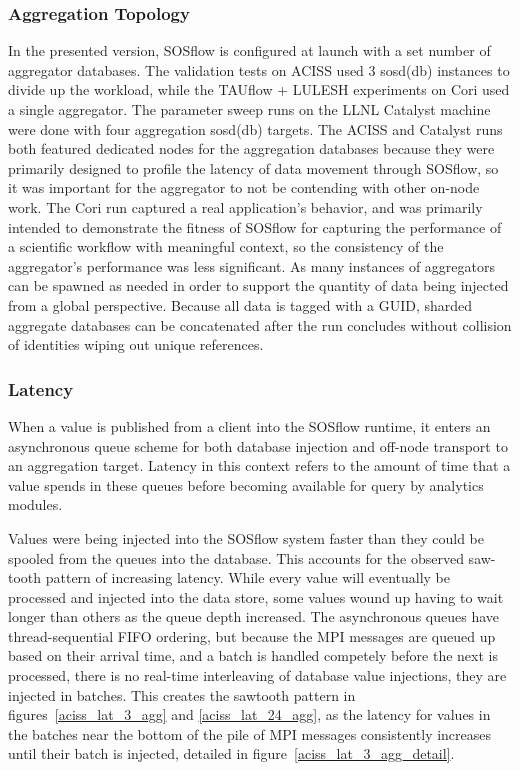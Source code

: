 \subsubsection{Aggregation Topology}
In the presented version, SOSflow is configured at launch with a set
number of aggregator databases.
%
The validation tests on ACISS used 3 sosd(db) instances to divide up
the workload, while the TAUflow + LULESH experiments on Cori used a
single aggregator.
%
The parameter sweep runs on the LLNL Catalyst machine were done with
four aggregation sosd(db) targets.
%
The ACISS and Catalyst runs both featured dedicated nodes for the
aggregation databases because they were primarily designed to profile
the latency of data movement through SOSflow, so it was important
for the aggregator to not be contending with other on-node work.
%
The Cori run captured a real application's behavior, and was primarily
intended to demonstrate the fitness of SOSflow for capturing the
performance of a scientific workflow with meaningful context, so the
consistency of the aggregator's performance was less significant.
%
As many instances of aggregators can be spawned as needed in order to
support the quantity of data being injected from a global
perspective.
%
Because all data is tagged with a GUID, sharded aggregate databases
can be concatenated after the run concludes without collision of
identities wiping out unique references.




\subsubsection{Latency} %
When a value is published from a client into the SOSflow runtime,
it enters an asynchronous queue scheme for both database injection
and off-node transport to an aggregation target.
%
Latency in this context refers to the amount of time that a value
spends in these queues before becoming available for query by
analytics modules.
%
\par
%
Values were being injected into the SOSflow system faster than
they could be spooled from the queues into the database.  This accounts
for the observed saw-tooth pattern of increasing latency.
%
While every value will eventually be processed and injected into the data
store, some values wound up having to wait longer than others as the queue
depth increased.
%
The asynchronous queues have thread-sequential FIFO ordering, but
because the MPI messages are queued up based on their arrival time,
and a batch is handled competely before the next is processed, there
is no real-time interleaving of database value injections, they are
injected in batches.
%
This creates the sawtooth pattern in figures~\ref{aciss_lat_3_agg} and
\ref{aciss_lat_24_agg}, as the latency for values in the batches near
the bottom of the pile of MPI messages consistently increases until
their batch is injected, detailed in
figure~\ref{aciss_lat_3_agg_detail}.

